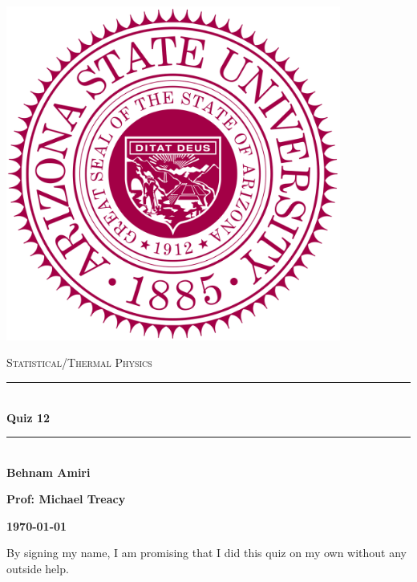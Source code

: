 \documentclass[fleqn]{article}
\begin{document}
  \begin{titlepage}

    \newcommand{\HRule}{\rule{\linewidth}{0.5mm}}

    \center

    \begin{center}
      \includegraphics[height=11cm, width=11cm]{asu.png}
    \end{center}

    \vline

    \textsc{\LARGE Statistical/Thermal Physics}\\[1.5cm]

    \HRule \\[0.5cm]
    { \huge \bfseries Quiz 12}\\[0.4cm] 
    \HRule \\[1.0cm]

    \textbf{Behnam Amiri}

    \bigbreak

    \textbf{Prof: Michael Treacy}

    \bigbreak

    \textbf{{\large \today}\\[2cm]}

    \vfill

  \end{titlepage}

  
  By signing my name, I am promising that I did this quiz on my own without any outside help.

  \vspace{0.5cm}
\end{document}
